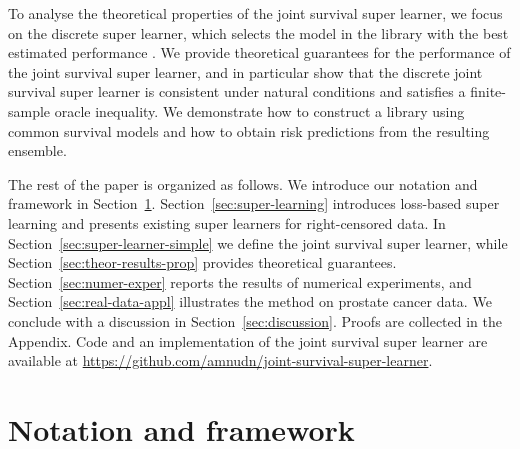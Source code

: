 \documentclass[lineno]{biometrika}
\newcommand{\1}{\mathds{1}}
\begin{document}
To analyse the theoretical properties of the joint survival super
learner, we focus on the discrete super learner, which selects the
model in the library with the best estimated performance
\citep{van2007super}. We provide theoretical guarantees for the
performance of the joint survival super learner, and in particular
show that the discrete joint survival super learner is consistent
under natural conditions and satisfies a finite-sample oracle
inequality. We demonstrate how to construct a library using common
survival models and how to obtain risk predictions from the resulting
ensemble.

The rest of the paper is organized as follows. We introduce our
notation and framework in Section~\ref{sec:framework}.
Section~\ref{sec:super-learning} introduces loss-based super learning
and presents existing super learners for right-censored data. In
Section~\ref{sec:super-learner-simple} we define the joint survival
super learner, while Section~\ref{sec:theor-results-prop} provides
theoretical guarantees. Section~\ref{sec:numer-exper} reports the
results of numerical experiments, and Section~\ref{sec:real-data-appl}
illustrates the method on prostate cancer data. We conclude with a
discussion in Section~\ref{sec:discussion}. Proofs are collected in
the Appendix. Code and an implementation of the joint
survival super learner are available at
\url{https://github.com/amnudn/joint-survival-super-learner}.

\section{Notation and framework}
\label{sec:framework}
\end{document}
